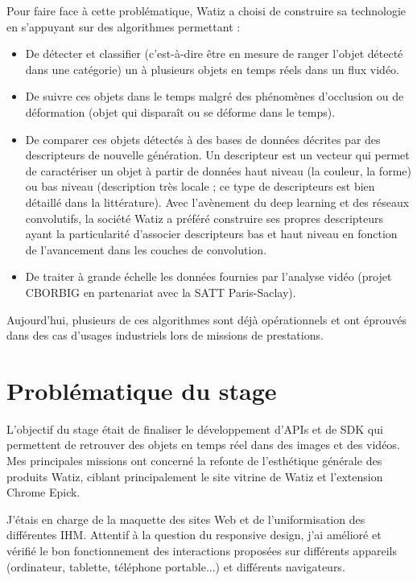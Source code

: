 \documentclass[a4paper, 12pt]{report}
\begin{document}
Pour faire face à cette problématique, Watiz a choisi de construire sa technologie en s’appuyant sur des algorithmes permettant :
 \begin{itemize}
\item De détecter et classifier (c’est-à-dire être en mesure de ranger l’objet détecté dans une catégorie) un à plusieurs objets en temps réels dans un flux vidéo.
\item De suivre ces objets dans le temps malgré des phénomènes d’occlusion ou de déformation (objet qui disparaît ou se déforme dans le temps).
\item De comparer ces objets détectés à des bases de données décrites par des descripteurs de nouvelle génération. Un descripteur est un vecteur qui permet de caractériser un objet à partir de données haut niveau (la couleur, la forme) ou bas niveau (description très locale ; ce type de descripteurs est bien détaillé dans la littérature). Avec l'avènement du deep learning et des réseaux convolutifs, la société Watiz a préféré construire ses propres descripteurs ayant la particularité d’associer descripteurs bas et haut niveau en fonction de l’avancement dans les couches de convolution.
\item De traiter à grande échelle les données fournies par l’analyse vidéo (projet CBORBIG en partenariat avec la SATT Paris-Saclay).
\end{itemize}
Aujourd’hui, plusieurs de ces algorithmes sont déjà opérationnels et ont éprouvés dans des cas d’usages industriels lors de missions de prestations.
\section{Problématique du stage}
L'objectif du stage était de finaliser le développement d’APIs et de SDK qui permettent de retrouver des objets en temps réel dans des images et des vidéos. 
Mes principales missions ont concerné la refonte de l’esthétique générale des produits Watiz, ciblant principalement le site vitrine de Watiz et l’extension Chrome Epick.

J’étais en charge de la maquette des sites Web et de l’uniformisation des différentes IHM. Attentif à la question du responsive design, j’ai amélioré et vérifié le bon fonctionnement des interactions proposées sur différents appareils (ordinateur, tablette, téléphone portable...) et différents navigateurs. 
\end{document}
